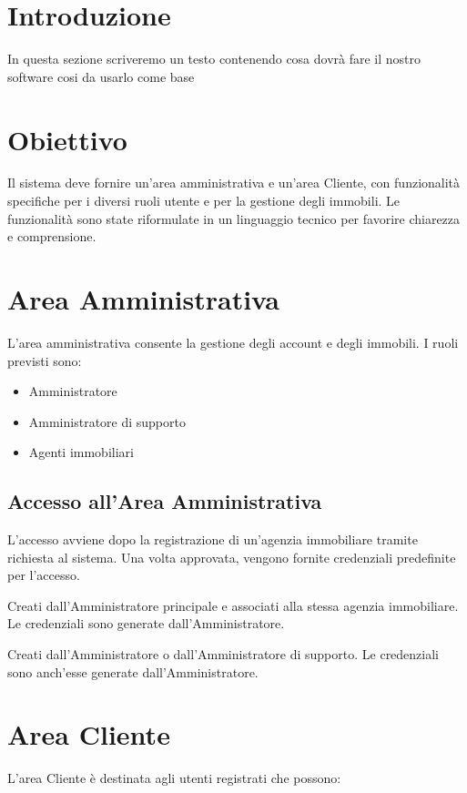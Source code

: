 \section*{Introduzione}
In questa sezione scriveremo un testo contenendo cosa dovrà fare il nostro software cosi da usarlo come base 

\section*{Obiettivo}
Il sistema deve fornire un'area amministrativa e un'area Cliente, con funzionalità specifiche per i diversi ruoli utente e per la gestione degli immobili. Le funzionalità sono state riformulate in un linguaggio tecnico per favorire chiarezza e comprensione.

\section*{Area Amministrativa}
L'area amministrativa consente la gestione degli account e degli immobili. I ruoli previsti sono:
\begin{itemize}
    \item Amministratore
    \item Amministratore di supporto
    \item Agenti immobiliari
\end{itemize}

\subsection*{Accesso all'Area Amministrativa}
\begin{description}[style=nextline]
    \item[Amministratore:] L'accesso avviene dopo la registrazione di un'agenzia immobiliare tramite richiesta al sistema. Una volta approvata, vengono fornite credenziali predefinite per l'accesso.
    \item[Amministratore di supporto:] Creati dall'Amministratore principale e associati alla stessa agenzia immobiliare. Le credenziali sono generate dall'Amministratore.
    \item[Agenti immobiliari:] Creati dall'Amministratore o dall'Amministratore di supporto. Le credenziali sono anch'esse generate dall'Amministratore.
\end{description}

\section*{Area Cliente}
L'area Cliente è destinata agli utenti registrati che possono:


